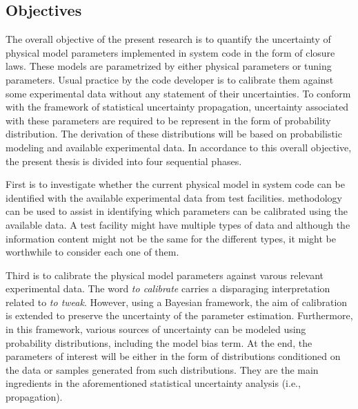 \subsection{Objectives}\label{sub:intro_objectives}

The overall objective of the present research is to quantify the uncertainty of physical model parameters implemented in system code in the form of closure laws.
These models are parametrized by either physical parameters or tuning parameters.
Usual practice by the code developer is to calibrate them against some experimental data without any statement of their uncertainties.
To conform with the framework of statistical uncertainty propagation, uncertainty associated with these parameters are required to be represent in the form of probability distribution.
The derivation of these distributions will be based on probabilistic modeling and available experimental data.
In accordance to this overall objective, the present thesis is divided into four sequential phases.

First is to investigate whether the current physical model in system code can be identified with the available experimental data from test facilities.
 methodology can be used to assist in identifying which parameters can be calibrated using the available data.
A test facility might have multiple types of data and although the information content might not be the same for the different types, it might be worthwhile to consider each one of them.


Third is to calibrate the physical model parameters against varous relevant experimental data.
The word \emph{to calibrate} carries a disparaging interpretation related to \emph{to tweak}.
However, using a Bayesian framework, the aim of calibration is extended to preserve the uncertainty of the parameter estimation.
Furthermore, in this framework, various sources of uncertainty can be modeled using probability distributions, including the model bias term.
At the end, the parameters of interest will be either in the form of distributions conditioned on the data or samples generated from such distributions.
They are the main ingredients in the aforementioned statistical uncertainty analysis (i.e., propagation).

